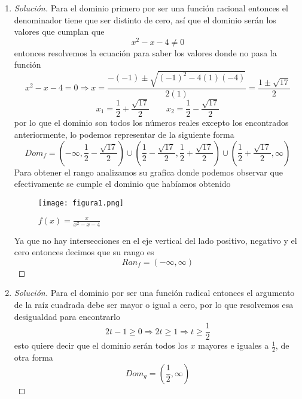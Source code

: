 \documentclass[12pt]{article}
\newenvironment{solution}{\begin{proof}[Solución]}{\end{proof}}
\begin{document}
\begin{enumerate}
    \item \begin{solution}
        Para el dominio primero por ser una función racional entonces el denominador tiene que ser distinto de cero, así que el dominio serán los valores que cumplan que \[x^2-x-4 \neq 0\] entonces resolvemos la ecuación para saber los valores donde no pasa la función
        \[x^2-x-4 = 0 \Rightarrow x = \frac{-(-1) \pm \sqrt{(-1)^2-4(1)(-4)}}{2(1)} = \frac{1 \pm \sqrt{17}}{2}\]
        \[x_1 = \frac{1}{2} + \frac{\sqrt{17}}{2} \qquad x_2 = \frac{1}{2} - \frac{\sqrt{17}}{2}\]
        por lo que el dominio son todos los números reales excepto los encontrados anteriormente, lo podemos representar de la siguiente forma
        \[Dom_f = \left(-\infty, \frac{1}{2} - \frac{\sqrt{17}}{2}\right) \cup \left(\frac{1}{2} - \frac{\sqrt{17}}{2}, \frac{1}{2} + \frac{\sqrt{17}}{2}\right) \cup \left(\frac{1}{2} + \frac{\sqrt{17}}{2}, \infty\right)\]
        Para obtener el rango analizamos su grafica donde podemos observar que efectivamente se cumple el dominio que habíamos obtenido 
        \begin{figure}[H]
            \centering
            \texttt{[image: figura1.png]}
            \caption{$f(x) = \frac{x}{x^2-x-4}$}
        \end{figure}
        Ya que no hay intersecciones en el eje vertical del lado positivo, negativo y el cero entonces decimos que su rango es
        \[Ran_f = (-\infty,\infty)\]
    \end{solution}
    \item \begin{solution}
        Para el dominio por ser una función radical entonces el argumento de la raíz cuadrada debe ser mayor o igual a cero, por lo que resolvemos esa desigualdad para encontrarlo
        \[2t -1 \geq 0 \Rightarrow 2t \geq 1 \Rightarrow t \geq \frac{1}{2}\] 
        esto quiere decir que el dominio serán todos los $x$ mayores e iguales a $\frac{1}{2}$, de otra forma
        \[Dom_g = \left(\frac{1}{2} , \infty\right)\]
    \end{solution}
\end{enumerate}

\end{document}
